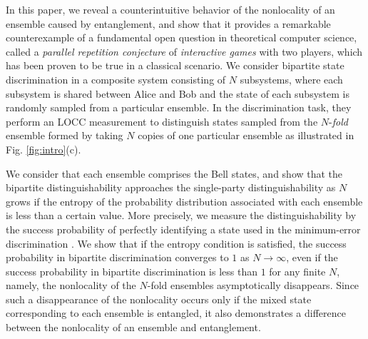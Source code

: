 \documentclass[aps,prx,twocolumn,showpacs,amsmath,notitlepage,amssymb,superscriptaddress]{revtex4-1}
\begin{document}
In this paper, we reveal a counterintuitive behavior of the nonlocality of an ensemble caused by entanglement, and show that it provides a remarkable counterexample of a fundamental open question in theoretical computer science, called a {\it parallel repetition conjecture} of {\it interactive games} with two players, which has been proven to be true in a classical scenario. We consider bipartite state discrimination in a composite system consisting of $N$ subsystems, where each subsystem is shared between Alice and Bob and the state of each subsystem is randomly sampled from a particular ensemble. In the discrimination task, they perform an LOCC measurement to distinguish states sampled from the $N$-{\it fold} ensemble formed by taking $N$ copies of one particular ensemble as illustrated in Fig. \ref{fig:intro}(c).

We consider that each ensemble comprises the Bell states, and show that the bipartite distinguishability approaches the single-party distinguishability as $N$ grows if the entropy of the probability distribution associated with each ensemble is less than a certain value. More precisely, we measure the distinguishability by the success probability of perfectly identifying a state used in the minimum-error discrimination \cite{statediscrimination}. We show that if the entropy condition is satisfied, the success probability in bipartite discrimination converges to $1$ as $N\rightarrow\infty$, even if the success probability in bipartite discrimination is less than $1$ for any finite $N$, namely,  the nonlocality of the $N$-fold ensembles asymptotically disappears. Since such a disappearance of the nonlocality occurs only if the mixed state corresponding to each ensemble is entangled, it also demonstrates a difference between the nonlocality of an ensemble and entanglement.
\end{document}
